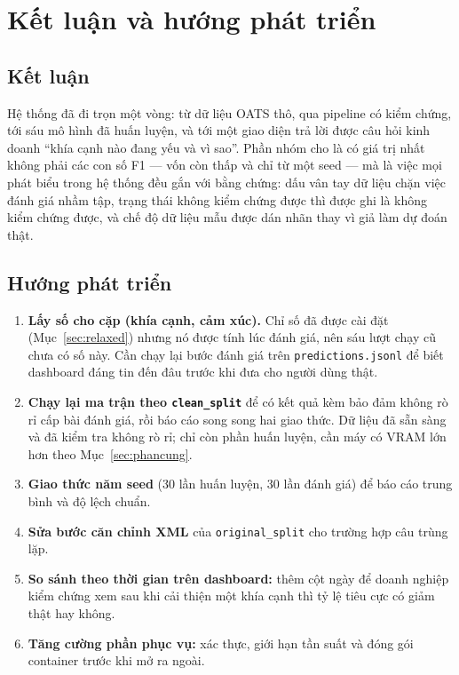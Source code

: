 \documentclass[12pt,a4paper]{report}
\newcommand{\enquote}[1]{“#1”}
\newcommand{\code}[1]{\texttt{#1}}
\begin{document}
\chapter{Kết luận và hướng phát triển}
\label{chap:ketluan}

\section{Kết luận}

Hệ thống đã đi trọn một vòng: từ dữ liệu OATS thô, qua pipeline có kiểm chứng, tới sáu mô hình đã huấn luyện, và tới một
giao diện trả lời được câu hỏi kinh doanh \enquote{khía cạnh nào đang yếu và vì sao}. Phần nhóm cho là có giá trị nhất
không phải các con số F1 --- vốn còn thấp và chỉ từ một seed --- mà là việc mọi phát biểu trong hệ thống đều gắn với
bằng chứng: dấu vân tay dữ liệu chặn việc đánh giá nhầm tập, trạng thái không kiểm chứng được thì được ghi là không
kiểm chứng được, và chế độ dữ liệu mẫu được dán nhãn thay vì giả làm dự đoán thật.

\section{Hướng phát triển}

\begin{enumerate}
  \item \textbf{Lấy số cho cặp (khía cạnh, cảm xúc).} Chỉ số đã được cài đặt (Mục~\ref{sec:relaxed}) nhưng nó được tính
        lúc đánh giá, nên sáu lượt chạy cũ chưa có số này. Cần chạy lại bước đánh giá trên \code{predictions.jsonl} để
        biết dashboard đáng tin đến đâu trước khi đưa cho người dùng thật.
  \item \textbf{Chạy lại ma trận theo \code{clean\_split}} để có kết quả kèm bảo đảm không rò rỉ cấp bài đánh giá, rồi
        báo cáo song song hai giao thức. Dữ liệu đã sẵn sàng và đã kiểm tra không rò rỉ; chỉ còn phần huấn luyện, cần
        máy có VRAM lớn hơn theo Mục~\ref{sec:phancung}.
  \item \textbf{Giao thức năm seed} (30 lần huấn luyện, 30 lần đánh giá) để báo cáo trung bình và độ lệch chuẩn.
  \item \textbf{Sửa bước căn chỉnh XML} của \code{original\_split} cho trường hợp câu trùng lặp.
  \item \textbf{So sánh theo thời gian trên dashboard:} thêm cột ngày để doanh nghiệp kiểm chứng xem sau khi cải thiện
        một khía cạnh thì tỷ lệ tiêu cực có giảm thật hay không.
  \item \textbf{Tăng cường phần phục vụ:} xác thực, giới hạn tần suất và đóng gói container trước khi mở ra ngoài.
\end{enumerate}



\end{document}
